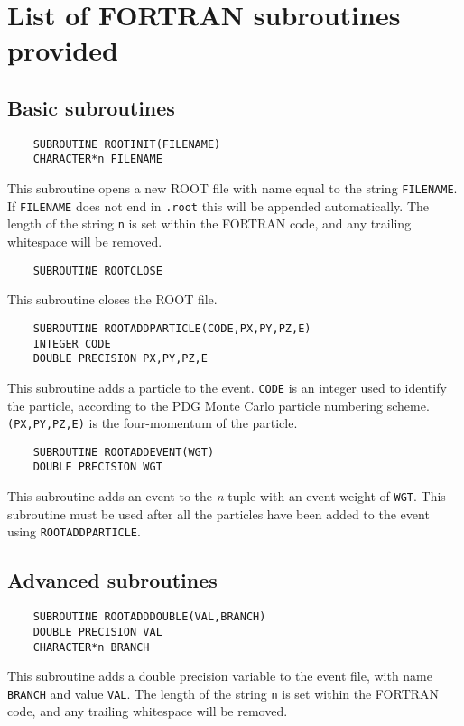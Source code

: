\documentclass[a4paper,12pt]{article}
\begin{document}
\section{List of FORTRAN subroutines provided}
\label{sec:routines}
\subsection{Basic subroutines}
\begin{verbatim}
    SUBROUTINE ROOTINIT(FILENAME)
    CHARACTER*n FILENAME\end{verbatim}
This subroutine opens a new ROOT file with name equal to the string \verb|FILENAME|. If \verb|FILENAME| does not end in \verb|.root| this will be appended automatically. The length of the string \verb|n| is set within the FORTRAN code, and any trailing whitespace will be removed.

\begin{verbatim}
    SUBROUTINE ROOTCLOSE\end{verbatim}
This subroutine closes the ROOT file.

\begin{verbatim}
    SUBROUTINE ROOTADDPARTICLE(CODE,PX,PY,PZ,E)
    INTEGER CODE
    DOUBLE PRECISION PX,PY,PZ,E\end{verbatim}
This subroutine adds a particle to the event. \verb|CODE| is an integer used to identify the particle, according to the PDG Monte Carlo particle numbering scheme. \verb|(PX,PY,PZ,E)| is the four-momentum of the particle.

\begin{verbatim}
    SUBROUTINE ROOTADDEVENT(WGT)
    DOUBLE PRECISION WGT\end{verbatim}
This subroutine adds an event to the \emph{n}-tuple with an event weight of \verb|WGT|. This subroutine must be used after all the particles have been added to the event using \verb|ROOTADDPARTICLE|.

\subsection{Advanced subroutines}
\begin{verbatim}
    SUBROUTINE ROOTADDDOUBLE(VAL,BRANCH)
    DOUBLE PRECISION VAL
    CHARACTER*n BRANCH\end{verbatim}
This subroutine adds a double precision variable to the event file, with name \verb|BRANCH| and value \verb|VAL|. The length of the string \verb|n| is set within the FORTRAN code, and any trailing whitespace will be removed.
\end{document}
